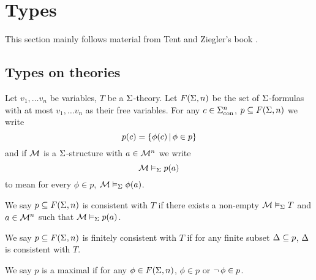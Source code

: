 \section{Types}
This section mainly follows material from Tent and Ziegler's book \cite{tent}.
\subsection{Types on theories}
\begin{dfn}
    Let ${v_1,\dots v_n}$ be variables,
    $T$ be a $\Sigma$-theory.
    Let $F(\Sigma,n)$ be the set of $\Sigma$-formulas with at most 
    $v_1,\dots v_n$ as their free variables.
    For any $c \in {\Sigma}_\mathrm{con}^n$, $p \subseteq F(\Sigma,n)$
    we write 
    \[p(c) = \left\{\phi(c) \,|\, \phi \in p\right\}\]
    and if $\mathcal{M}$ is a $\Sigma$-structure with $a \in {\mathcal{M}}^n$ we write 
    \[\mathcal{M} \vDash_{\Sigma} p(a)\]
    to mean for every $\phi \in p$, $\mathcal{M} \vDash_{\Sigma} \phi(a)$.

    We say $p \subseteq F(\Sigma,n)$ is consistent with $T$ if there exists a non-empty 
    $\mathcal{M} \vDash_{\Sigma} T$ and $a \in {\mathcal{M}}^n$
    such that $\mathcal{M} \vDash_{\Sigma} p(a)$. 

    We say $p \subseteq F(\Sigma,n)$ is finitely consistent with $T$ 
    if for any finite subset $\Delta \subseteq p$, 
    $\Delta$ is consistent with $T$.

    We say $p$ is a maximal if for any $\phi \in F(\Sigma,n)$,
    $\phi \in p$ or $\neg\, \phi \in p$.
\end{dfn}

